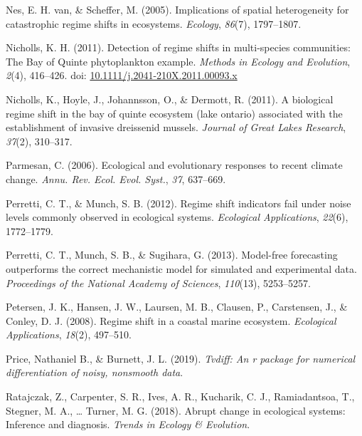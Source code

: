 \documentclass[12pt,twoside,openany]{reedthesis}
\begin{document}
\leavevmode\hypertarget{ref-van2005implications}{}%
Nes, E. H. van, \& Scheffer, M. (2005). Implications of spatial heterogeneity for catastrophic regime shifts in ecosystems. \emph{Ecology}, \emph{86}(7), 1797--1807.

\leavevmode\hypertarget{ref-nicholls_detection_2011}{}%
Nicholls, K. H. (2011). Detection of regime shifts in multi-species communities: The Bay of Quinte phytoplankton example. \emph{Methods in Ecology and Evolution}, \emph{2}(4), 416--426. doi: \href{https://doi.org/10.1111/j.2041-210X.2011.00093.x}{10.1111/j.2041-210X.2011.00093.x}

\leavevmode\hypertarget{ref-nicholls2011biological}{}%
Nicholls, K., Hoyle, J., Johannsson, O., \& Dermott, R. (2011). A biological regime shift in the bay of quinte ecosystem (lake ontario) associated with the establishment of invasive dreissenid mussels. \emph{Journal of Great Lakes Research}, \emph{37}(2), 310--317.

\leavevmode\hypertarget{ref-parmesan_ecological_2006}{}%
Parmesan, C. (2006). Ecological and evolutionary responses to recent climate change. \emph{Annu. Rev. Ecol. Evol. Syst.}, \emph{37}, 637--669.

\leavevmode\hypertarget{ref-perretti2012regime}{}%
Perretti, C. T., \& Munch, S. B. (2012). Regime shift indicators fail under noise levels commonly observed in ecological systems. \emph{Ecological Applications}, \emph{22}(6), 1772--1779.

\leavevmode\hypertarget{ref-perretti_model-free_2013}{}%
Perretti, C. T., Munch, S. B., \& Sugihara, G. (2013). Model-free forecasting outperforms the correct mechanistic model for simulated and experimental data. \emph{Proceedings of the National Academy of Sciences}, \emph{110}(13), 5253--5257.

\leavevmode\hypertarget{ref-petersen2008regime}{}%
Petersen, J. K., Hansen, J. W., Laursen, M. B., Clausen, P., Carstensen, J., \& Conley, D. J. (2008). Regime shift in a coastal marine ecosystem. \emph{Ecological Applications}, \emph{18}(2), 497--510.

\leavevmode\hypertarget{ref-price2019tvdiff}{}%
Price, Nathaniel B., \& Burnett, J. L. (2019). \emph{Tvdiff: An r package for numerical differentiation of noisy, nonsmooth data}.

\leavevmode\hypertarget{ref-ratajczak2018abrupt}{}%
Ratajczak, Z., Carpenter, S. R., Ives, A. R., Kucharik, C. J., Ramiadantsoa, T., Stegner, M. A., \ldots{} Turner, M. G. (2018). Abrupt change in ecological systems: Inference and diagnosis. \emph{Trends in Ecology \& Evolution}.
\end{document}
